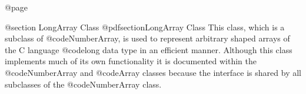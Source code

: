 @page

@section  LongArray Class
@pdfsection{LongArray Class}
This class, which is a subclass of @code{NumberArray}, is used to
represent arbitrary shaped arrays of the C language @code{long} data
type in an efficient manner.  Although this class implements much of its
own functionality it is documented within the @code{NumberArray} and
@code{Array} classes because the interface is shared by all subclasses
of the @code{NumberArray} class.








